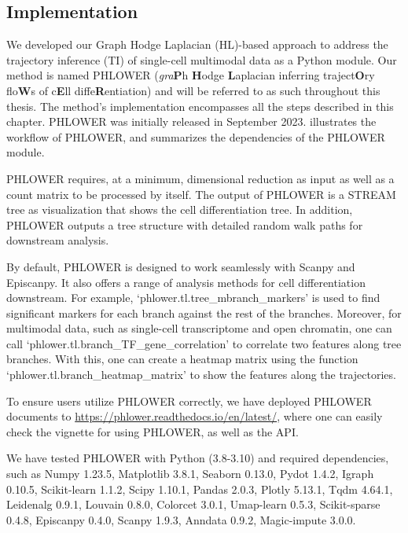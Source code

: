 \subsection{Implementation}
We developed our Graph Hodge Laplacian (HL)-based approach to address the trajectory inference (TI) of single-cell multimodal data as a Python module. Our method is named PHLOWER (\textit{gra}\textbf{P}h \textbf{H}odge \textbf{L}aplacian inferring traject\textbf{O}ry flo\textbf{W}s of c\textbf{E}ll diffe\textbf{R}entiation) and will be referred to as such throughout this thesis. The method's implementation encompasses all the steps described in this chapter. PHLOWER was initially released in September 2023.  illustrates the workflow of PHLOWER, and  summarizes the dependencies of the PHLOWER module.

PHLOWER requires, at a minimum, dimensional reduction as input as well as a count matrix to be processed by itself. The output of PHLOWER is a STREAM tree as visualization that shows the cell differentiation tree. In addition, PHLOWER outputs a tree structure with detailed random walk paths for downstream analysis.

By default, PHLOWER is designed to work seamlessly with Scanpy and Episcanpy. It also offers a range of analysis methods for cell differentiation downstream. For example, `phlower.tl.tree\_mbranch\_markers' is used to find significant markers for each branch against the rest of the branches. Moreover, for multimodal data, such as single-cell transcriptome and open chromatin, one can call `phlower.tl.branch\_TF\_gene\_correlation' to correlate two features along tree branches. With this, one can create a heatmap matrix using the function `phlower.tl.branch\_heatmap\_matrix' to show the features along the trajectories.

To ensure users utilize PHLOWER correctly, we have deployed PHLOWER documents to \url{https://phlower.readthedocs.io/en/latest/}, where one can easily check the vignette for using PHLOWER, as well as the API.

We have tested PHLOWER with Python (3.8-3.10) and required dependencies, such as Numpy 1.23.5, Matplotlib 3.8.1, Seaborn 0.13.0, Pydot 1.4.2, Igraph 0.10.5, Scikit-learn 1.1.2, Scipy 1.10.1, Pandas 2.0.3, Plotly 5.13.1, Tqdm 4.64.1, Leidenalg 0.9.1, Louvain 0.8.0, Colorcet 3.0.1, Umap-learn 0.5.3, Scikit-sparse 0.4.8, Episcanpy 0.4.0, Scanpy 1.9.3, Anndata 0.9.2, Magic-impute 3.0.0.

